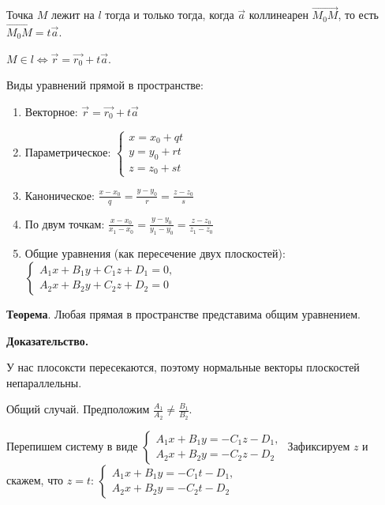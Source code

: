 \documentclass[a4paper]{article}
\begin{document}
{\begin{small}
Точка $M$ лежит на $l$ тогда и только тогда, когда $\vec{a}$ коллинеарен $\overrightarrow{M_0M}$, то есть $\overrightarrow{M_0M}  = t\vec{a}$.

$M \in l \Leftrightarrow \vec{r} = \vec{r_0} + t\vec{a}$.

Виды уравнений прямой в пространстве:
\begin{enumerate}
\item Векторное: $\vec{r} = \vec{r_0} + t\vec{a}$
\item Параметрическое: $\begin{cases}
   x=x_0+qt
   \\
   y=y_0+rt
   \\
   z=z_0+st
 \end{cases}$
\item Каноническое: $\displaystyle \frac{x-x_0}{q} = \frac{y-y_0}{r} = \frac{z-z_0}{s}$
\item По двум точкам: $\displaystyle \frac{x-x_0}{x_1-x_0} = \frac{y-y_0}{y_1-y_0} = \frac{z-z_0}{z_1-z_0}$
\item Общие уравнения (как пересечение двух плоскостей): $\begin{cases}
A_1x+B_1y+C_1z+D_1=0,
\\
A_2x+B_2y+C_2z+D_2=0
\end{cases}$
\end{enumerate}

\textbf{Теорема}. Любая прямая в пространстве представима общим уравнением.

\textbf{Доказательство.} 

У нас плосоксти пересекаются, поэтому нормальные векторы плоскостей непараллельны.

Общий случай. Предположим $\displaystyle \frac{A_1}{A_2} \neq \frac{B_1}{B_2}$.
 
 Перепишем систему в виде $\begin{cases}
 A_1x+B_1y=-C_1z-D_1,
 \\
 A_2x+B_2y=-C_2z-D_2
 \end{cases}
$ Зафиксируем $z$ и скажем, что $z=t$: $\displaystyle \begin{cases}
 A_1x+B_1y=-C_1t-D_1,
 \\
 A_2x+B_2y=-C_2t-D_2
 \end{cases}
$


\end{small}}
\end{document}
